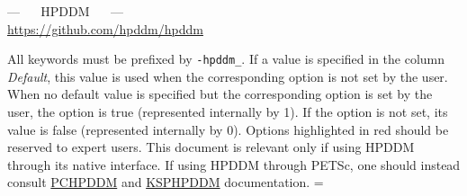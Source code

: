 \documentclass{article}
\begin{document}
\begin{center} {\LARGE --- $\quad$ HPDDM $\quad$ ---} \\[5pt] \url{https://github.com/hpddm/hpddm} \end{center}
All keywords must be prefixed by \texttt{-hpddm\_}. If a value is specified
in the column \emph{Default}, this value is used when the corresponding
option is not set by the user. When no default value is specified but the
corresponding option is set by the user, the option is true (represented
internally by 1). If the option is not set, its value is false (represented
internally by 0). Options highlighted in \colorbox{LightRed}{red} should be
reserved to expert users.
This document is relevant only if using HPDDM through its native interface. If
using HPDDM through PETSc, one should instead consult
\href{https://petsc.org/main/manualpages/PC/PCHPDDM/}{PCHPDDM} and
\href{https://petsc.org/main/manualpages/KSP/KSPHPDDM/}{KSPHPDDM}
documentation.
\vspace*{\parspace}
\newdimen\origiwspc
\origiwspc=\font
\newlength\LTbackup
\setlength{\LTbackup}{\LTleft}
\setlength{\LTleft}{0.15cm}
\end{document}

